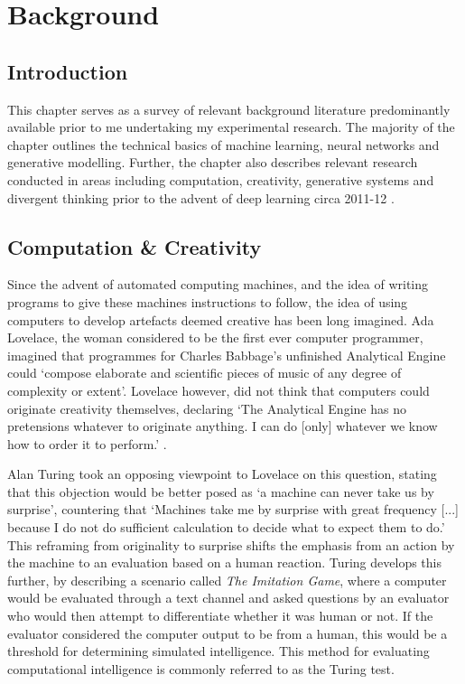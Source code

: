 \chapter{Background}
\label{ch:background}

\section{Introduction}

This chapter serves as a survey of relevant background literature predominantly available prior to me undertaking my experimental research.
The majority of the chapter outlines the technical basics of machine learning, neural networks and generative modelling.
Further, the chapter also describes relevant research conducted in areas including computation, creativity, generative systems and divergent thinking prior to the advent of deep learning circa 2011-12 \citep{krizhevsky2012imagenet}.

\section{Computation \& Creativity}

Since the advent of automated computing machines, and the idea of writing programs to give these machines instructions to follow, the idea of using computers to develop artefacts deemed creative has been long imagined. 
Ada Lovelace, the woman considered to be the first ever computer programmer, imagined that programmes for Charles Babbage's unfinished Analytical Engine could ‘compose elaborate and scientific pieces of music of any degree of complexity or extent’.
Lovelace however, did not think that computers could originate creativity themselves, declaring ‘The Analytical Engine has no pretensions whatever to originate anything. I can do [only] whatever we know how to order it to perform.' \citep{lovelace1843notes}.

Alan Turing took an opposing viewpoint to Lovelace on this question, stating that this objection would be better posed as ‘a machine can never take us by surprise’, countering that ‘Machines take me by surprise with great frequency [...] because I do not do sufficient calculation to decide what to expect them to do.’ \citep{machinery1950computing}
This reframing from originality to surprise shifts the emphasis from an action by the machine to an evaluation based on a human reaction. 
Turing develops this further, by describing a scenario called \textit{The Imitation Game}, where a computer would be evaluated through a text channel and asked questions by an evaluator who would then attempt to differentiate whether it was human or not. 
If the evaluator considered the computer output to be from a human, this would be a threshold for determining simulated intelligence.
This method for evaluating computational intelligence is commonly referred to as the Turing test. 

